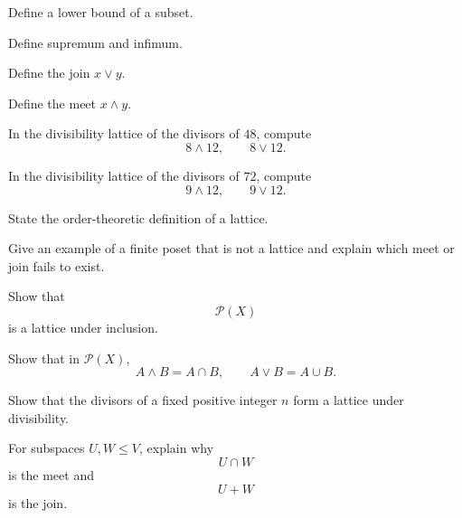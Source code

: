 \begin{exercise}[1]
Define a lower bound of a subset.
\end{exercise}

\begin{exercise}[1]
Define supremum and infimum.
\end{exercise}

\begin{exercise}[1]
Define the join \(x\vee y\).
\end{exercise}

\begin{exercise}[1]
Define the meet \(x\wedge y\).
\end{exercise}

\begin{exercise}[2]
In the divisibility lattice of the divisors of \(48\), compute
\[ 8\wedge12,\qquad8\vee12. \]
\end{exercise}

\begin{exercise}[2]
In the divisibility lattice of the divisors of \(72\), compute
\[ 9\wedge12,\qquad9\vee12. \]
\end{exercise}

\begin{exercise}[1]
State the order-theoretic definition of a lattice.
\end{exercise}

\begin{exercise}[2]
Give an example of a finite poset that is not a lattice and explain which
meet or join fails to exist.
\end{exercise}

\begin{exercise}[2]
Show that
\[ \mathcal P(X) \]
is a lattice under inclusion.
\end{exercise}

\begin{exercise}[2]
Show that in \(\mathcal P(X)\),
\[ A\wedge B=A\cap B,\qquad A\vee B=A\cup B. \]
\end{exercise}

\begin{exercise}[2]
Show that the divisors of a fixed positive integer \(n\) form a lattice
under divisibility.
\end{exercise}

\begin{exercise}[2]
For subspaces \(U,W\leq V\), explain why
\[ U\cap W \]
is the meet and
\[ U+W \]
is the join.
\end{exercise}

